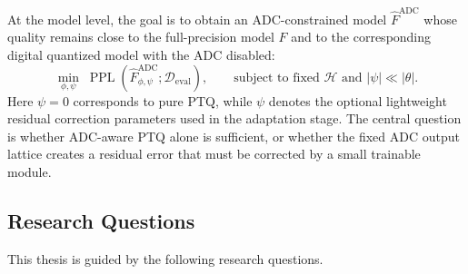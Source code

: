 \documentclass[a4paper,11pt,oneside]{article}
\theoremstyle{breakstyle}
\begin{document}
At the model level, the goal is to obtain an ADC-constrained model \(\hat{F}^{\mathrm{ADC}}\) whose quality remains close to the full-precision model \(F\) and to the corresponding digital quantized model with the ADC disabled:
\begin{equation}
    \min_{\phi, \psi}
    \;
    \operatorname{PPL}
    \left(
        \hat{F}^{\mathrm{ADC}}_{\phi,\psi};
        \mathcal{D}_{\mathrm{eval}}
    \right),
    \qquad
    \text{subject to fixed } \mathcal{H}
    \text{ and } |\psi| \ll |\theta|.
\end{equation}
Here \(\psi = 0\) corresponds to pure PTQ, while \(\psi\) denotes the optional lightweight residual correction parameters used in the adaptation stage. The central question is whether ADC-aware PTQ alone is sufficient, or whether the fixed ADC output lattice creates a residual error that must be corrected by a small trainable module.

\subsection{Research Questions}
\label{subsec:research_questions}

This thesis is guided by the following research questions.
\end{document}
